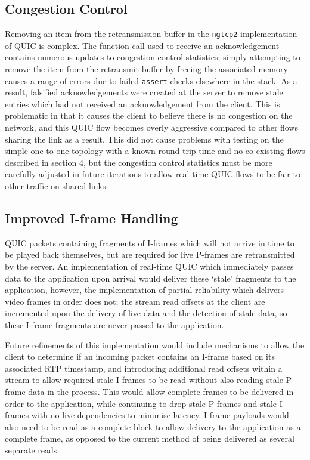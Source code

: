\documentclass{mpaper}
\begin{document}
\subsection{Congestion Control}
Removing an item from the retransmission buffer in the \texttt{ngtcp2} implementation of QUIC is complex. The function call used to receive an acknowledgement contains numerous updates to congestion control statistics; simply attempting to remove the item from the retransmit buffer by freeing the associated memory causes a range of errors due to failed \texttt{assert} checks elsewhere in the stack. As a result, falsified acknowledgements were created at the server to remove stale entries which had not received an acknowledgement from the client. This is problematic in that it causes the client to believe there is no congestion on the network, and this QUIC flow becomes overly aggressive compared to other flows sharing the link as a result. This did not cause problems with testing on the simple one-to-one topology with a known round-trip time and no co-existing flows described in section 4, but the congestion control statistics must be more carefully adjusted in future iterations to allow real-time QUIC flows to be fair to other traffic on shared links.


\subsection{Improved I-frame Handling}
QUIC packets containing fragments of I-frames which will not arrive in time to be played back themselves, but are required for live P-frames are retransmitted by the server. An implementation of real-time QUIC which immediately passes data to the application upon arrival would deliver these `stale' fragments to the application, however, the implementation of partial reliability which delivers video frames in order does not; the stream read offsets at the client are incremented upon the delivery of live data and the detection of stale data, so these I-frame fragments are never passed to the application.

Future refinements of this implementation would include mechanisms to allow the client to determine if an incoming packet contains an I-frame based on its associated RTP timestamp, and introducing additional read offsets within a stream to allow required stale I-frames to be read without also reading stale P-frame data in the process. This would allow complete frames to be delivered in-order to the application, while continuing to drop stale P-frames and stale I-frames with no live dependencies to minimise latency. I-frame payloads would also need to be read as a complete block to allow delivery to the application as a complete frame, as opposed to the current method of being delivered as several separate reads.
\end{document}
